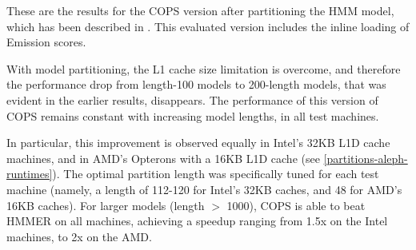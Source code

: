 These are the results for the COPS version after partitioning the HMM model, which has been described in . This evaluated version includes the inline loading of Emission scores.

With model partitioning, the L1 cache size limitation is overcome, and therefore the performance drop from length-100 models to 200-length models, that was evident in the earlier results, disappears. The performance of this version of COPS remains constant with increasing model lengths, in all test machines. 

In particular, this improvement is observed equally in Intel's 32KB L1D cache machines, and in AMD's Opterons with a 16KB L1D cache (see \autoref{partitions-aleph-runtimes}). The optimal partition length was specifically tuned for each test machine (namely, a length of 112-120 for Intel's 32KB caches, and 48 for AMD's 16KB caches). For larger models (length $>$ 1000), COPS is able to beat HMMER on all machines, achieving a speedup ranging from 1.5x on the Intel machines, to 2x on the AMD.

